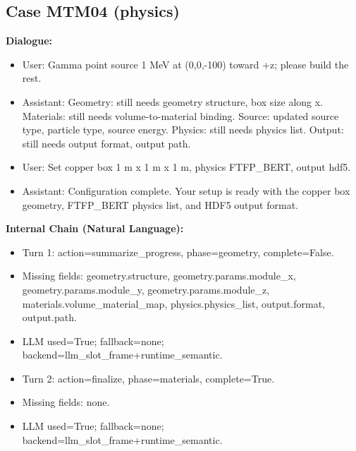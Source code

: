 \documentclass[11pt]{ctexart}
\begin{document}
\subsection{Case MTM04 (physics)}
\textbf{Dialogue:}
\begin{itemize}
\item User: Gamma point source 1 MeV at (0,0,-100) toward +z; please build the rest.
\item Assistant: Geometry: still needs geometry structure, box size along x. Materials: still needs volume-to-material binding. Source: updated source type, particle type, source energy. Physics: still needs physics list. Output: still needs output format, output path.
\item User: Set copper box 1 m x 1 m x 1 m, physics FTFP\_BERT, output hdf5.
\item Assistant: Configuration complete. Your setup is ready with the copper box geometry, FTFP\_BERT physics list, and HDF5 output format.
\end{itemize}
\textbf{Internal Chain (Natural Language):}
\begin{itemize}
\item Turn 1: action=summarize\_progress, phase=geometry, complete=False.
\item Missing fields: geometry.structure, geometry.params.module\_x, geometry.params.module\_y, geometry.params.module\_z, materials.volume\_material\_map, physics.physics\_list, output.format, output.path.
\item LLM used=True; fallback=none; backend=llm\_slot\_frame+runtime\_semantic.
\item Turn 2: action=finalize, phase=materials, complete=True.
\item Missing fields: none.
\item LLM used=True; fallback=none; backend=llm\_slot\_frame+runtime\_semantic.
\end{itemize}
\end{document}
